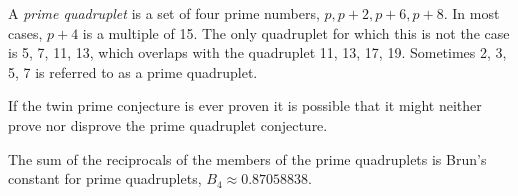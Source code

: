 \documentclass[12pt]{article}
\begin{document}
A \emph{prime quadruplet} is a set of four prime numbers, $p, p + 2, p + 6, p + 8$. In most cases, $p + 4$ is a multiple of 15. The only quadruplet for which this is not the case is 5, 7, 11, 13, which overlaps with the quadruplet 11, 13, 17, 19. Sometimes 2, 3, 5, 7 is referred to as a prime quadruplet.

If the twin prime conjecture is ever proven it is possible that it might neither prove nor disprove the prime quadruplet conjecture.

The sum of the reciprocals of the members of the prime quadruplets is Brun's constant for prime quadruplets, $B_4 \approx  0.87058838$.
\end{document}
